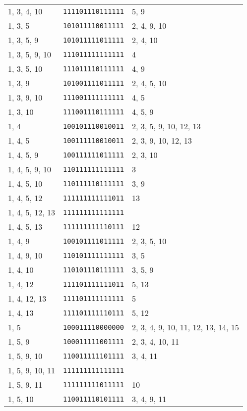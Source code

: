 \documentclass[a4paper,12pt]{article}
\begin{document}
\begin{longtable}{l|l|l}
        1, 3, 4, 10&\texttt{111101110111111}&5, 9\\
        1, 3, 5&\texttt{101011110011111}&2, 4, 9, 10\\
        1, 3, 5, 9&\texttt{101011111011111}&2, 4, 10\\
        1, 3, 5, 9, 10&\texttt{111011111111111}&4\\
        1, 3, 5, 10&\texttt{111011110111111}&4, 9\\
        1, 3, 9&\texttt{101001111011111}&2, 4, 5, 10\\
        1, 3, 9, 10&\texttt{111001111111111}&4, 5\\
        1, 3, 10&\texttt{111001110111111}&4, 5, 9\\
        1, 4&\texttt{100101110010011}&2, 3, 5, 9, 10, 12, 13\\
        1, 4, 5&\texttt{100111110010011}&2, 3, 9, 10, 12, 13\\
        1, 4, 5, 9&\texttt{100111111011111}&2, 3, 10\\
        1, 4, 5, 9, 10&\texttt{110111111111111}&3\\
        1, 4, 5, 10&\texttt{110111110111111}&3, 9\\
        1, 4, 5, 12&\texttt{111111111111011}&13\\
        1, 4, 5, 12, 13&\texttt{111111111111111}&\\
        1, 4, 5, 13&\texttt{111111111110111}&12\\
        1, 4, 9&\texttt{100101111011111}&2, 3, 5, 10\\
        1, 4, 9, 10&\texttt{110101111111111}&3, 5\\
        1, 4, 10&\texttt{110101110111111}&3, 5, 9\\
        1, 4, 12&\texttt{111101111111011}&5, 13\\
        1, 4, 12, 13&\texttt{111101111111111}&5\\
        1, 4, 13&\texttt{111101111110111}&5, 12\\
        1, 5&\texttt{100011110000000}&2, 3, 4, 9, 10, 11, 12, 13, 14, 15\\
        1, 5, 9&\texttt{100011111001111}&2, 3, 4, 10, 11\\
        1, 5, 9, 10&\texttt{110011111101111}&3, 4, 11\\
        1, 5, 9, 10, 11&\texttt{111111111111111}&\\
        1, 5, 9, 11&\texttt{111111111011111}&10\\
        1, 5, 10&\texttt{110011110101111}&3, 4, 9, 11\\

\end{longtable}
\end{document}
